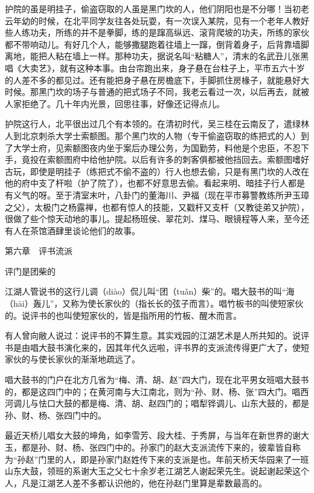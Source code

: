 \documentclass[12pt,UTF8]{ctexbook}
\begin{document}
护院的虽是明挂子，偷盗窃取的人虽是黑门坎的人，他们阴阳也是不分哪！当初老云年幼的时候，在北平同学友往各处玩耍，有一次误入某院，见有一个老年人教好些人练功夫，所练的并不是拳脚，练的是蹿高纵远、滚背爬坡的功夫，所练的家伙都不带响动儿。有好几个人，能够撒腿跑着往墙上一蹿，倒背着身子，后背靠墙脚离地，能把人粘在墙上一样。那种功夫，据说名叫“粘糖人”，清末的名武丑儿张黑唱《大卖艺》，就有这种本事。由台帘跑出来，身子悬在台柱子上，平市五六十岁的人差不多的都见过。还有能把身子悬在房檐底下，手脚抓住房椽子，就能悬好大时候。那黑门坎的场子与普通的把式场子不同，我老云看过一次，以后再去，就被人家拒绝了。几十年内光景，回思往事，好像还记得点儿。

护院这行人，北平很出过几个有本领的。在清初时代，吴三桂在云南反了，遣绿林人到北京刺杀大学士索额图。那个黑门坎的人物（专干偷盗窃取的练把式的人）到了大学士府，见索额图夜内坐于案后办理公务，为国勤劳，料他是个忠臣，不忍下手，竟投在索额图府中给他护院。以后有许多的刺客俱都被他挡回去。索额图嗜好古玩，即使是明挂子（练把式不偷不盗的）行人也想去偷，只是有黑门坎的人改在他的府中支了杆啦（护了院了），也都不好意思去偷。看起来明、暗挂子行人都是有义气的呀。至于清室末叶，八卦门的董海川、尹福（现在平市募警教练所尹玉璋之父），太极门之杨露禅，也都有惊人的技能，又戳杆又支杆（又教徒弟又护院），很做了些个惊天动地的事儿。提起杨班侯、翠花刘、煤马、眼镜程等人来，至今还有人在茶馆酒肆里谈论他们的故事。





第六章　评书流派


评门是团柴的


江湖人管说书的这行儿调（diào）侃儿叫“团（tuǎn）柴”的。唱大鼓书的叫“海（hāi）轰儿”，又称为使长家伙的（指长长的弦子而言）。唱竹板书的叫使短家伙的。说评书的也叫使短家伙的，皆是指所用的竹板、醒木而言。

有人曾向敝人说过：说评书的不算生意。其实戏园的江湖艺术是人所共知的。说评书是由唱大鼓书演化来的，因其年代久远啦，评书界的支派流传得更广大了，使短家伙的与使长家伙的渐渐地疏远了。

唱大鼓书的门户在北方几省为“梅、清、胡、赵”四大门，现在北平男女班唱大鼓书的，都是这四门中的；在黄河南与大江南北，则为“孙、财、杨、张”四大门。唱西河调儿与怯口大鼓的都是梅、清、胡、赵四门的；唱犁铧调儿、山东大鼓的，都是孙、财、杨、张四门中的。

最近天桥儿唱女大鼓的坤角，如李雪芳、段大桂、于秀屏，与当年在新世界的谢大玉，都是孙、财、杨、张四门中的。孙家门的赵大支派流传下来的，彼辈皆自称为“孙赵”门里的人，即是孙家门赵姓传下来的支派是也。年前天桥天华园来了一班山东大鼓，领班的系谢大玉之父七十余岁老江湖艺人谢起荣先生。说起谢起荣这个人，凡是江湖艺人差不多都认识他的，他在孙赵门里算是辈数最高的。
\end{document}
